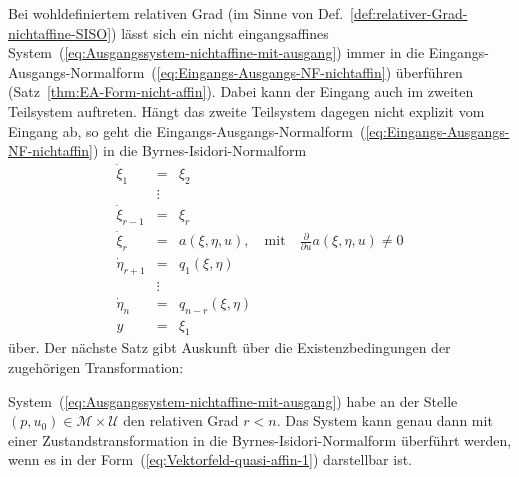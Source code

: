 Bei wohldefiniertem relativen Grad (im Sinne von Def.~\ref{def:relativer-Grad-nichtaffine-SISO})
lässt sich ein nicht eingangsaffines System~(\ref{eq:Ausgangssystem-nichtaffine-mit-ausgang})
immer in die Eingangs-Ausgangs-Normalform~(\ref{eq:Eingangs-Ausgangs-NF-nichtaffin})
überführen (Satz~\ref{thm:EA-Form-nicht-affin}). Dabei kann der
Eingang auch im zweiten Teilsystem auftreten. Hängt das zweite Teilsystem
dagegen nicht explizit vom Eingang ab, so geht die Eingangs-Ausgangs-Normalform~(\ref{eq:Eingangs-Ausgangs-NF-nichtaffin})
in die Byrnes-Isidori-Normalform
\begin{equation}
\begin{array}{lcl}
\dot{\xi}_{1} & = & \xi_{2}\\
 & \vdots\\
\dot{\xi}_{r-1} & = & \xi_{r}\\
\dot{\xi}_{r} & = & a(\xi,\eta,u),\quad\text{mit}\quad\frac{\partial}{\partial u}a(\xi,\eta,u)\neq0\\
\dot{\eta}_{r+1} & = & q_{1}(\xi,\eta)\\
 & \vdots\\
\dot{\eta}_{n} & = & q_{n-r}(\xi,\eta)\\
y & = & \xi_{1}
\end{array}\label{eq:BINF-nichtaffin}
\end{equation}
über. Der nächste Satz gibt Auskunft über die Existenzbedingungen
der zugehörigen Transformation:
\begin{theorem}
\label{thm:Bynres-Isidori-nichtaffin}System~(\ref{eq:Ausgangssystem-nichtaffine-mit-ausgang})
habe an der Stelle $(p,u_{0})\in\mathcal{M}\times\mathcal{U}$ den
relativen Grad $r<n$. Das System kann genau dann mit einer Zustandstransformation
in die Byrnes-Isidori-Normalform überführt werden, wenn es in der
Form~(\ref{eq:Vektorfeld-quasi-affin-1}) darstellbar ist.
\end{theorem}
